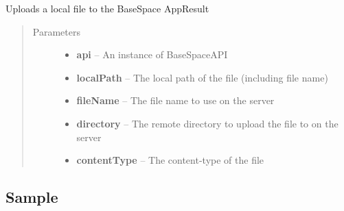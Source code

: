 \documentclass[letterpaper,10pt,english]{sphinxmanual}
\begin{document}
\begin{fulllineitems}
\begin{fulllineitems}
\label{Available modules:BaseSpacePy.model.AppResult.AppResult.uploadFile}
Uploads a local file to the BaseSpace AppResult
\begin{quote}\begin{description}
\item[{Parameters}] \leavevmode\begin{itemize}
\item {} 
\textbf{api} -- An instance of BaseSpaceAPI

\item {} 
\textbf{localPath} -- The local path of the file (including file name)

\item {} 
\textbf{fileName} -- The file name to use on the server

\item {} 
\textbf{directory} -- The remote directory to upload the file to on the server

\item {} 
\textbf{contentType} -- The content-type of the file

\end{itemize}

\end{description}\end{quote}

\end{fulllineitems}


\end{fulllineitems}



\subsection{Sample}
\label{Available modules:sample}
\end{document}
